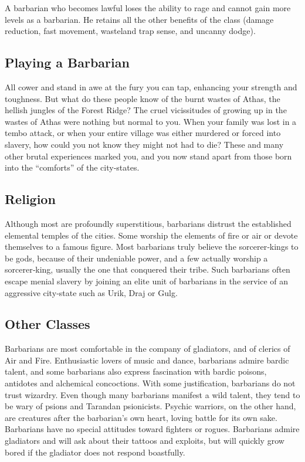 A barbarian who becomes lawful loses the ability to rage and cannot gain more levels as a barbarian. He retains all the other benefits of the class (damage reduction, fast movement, wasteland trap sense, and uncanny dodge).

\subsection{Playing a Barbarian}

All cower and stand in awe at the fury you can tap, enhancing your strength and toughness. But what do these people know of the burnt wastes of Athas, the hellish jungles of the Forest Ridge? The cruel vicissitudes of growing up in the wastes of Athas were nothing but normal to you. When your family was lost in a tembo attack, or when your entire village was either murdered or forced into slavery, how could you not know they might not had to die? These and many other brutal experiences marked you, and you now stand apart from those born into the “comforts” of the city‐states.

\subsection{Religion}

Although most are profoundly superstitious, barbarians distrust the established elemental temples of the cities. Some worship the elements of fire or air or devote themselves to a famous figure. Most barbarians truly believe the sorcerer‐kings to be gods, because of their undeniable power, and a few actually worship a sorcerer‐king, usually the one that conquered their tribe. Such barbarians often escape menial slavery by joining an elite unit of barbarians in the service of an aggressive city‐state such as Urik, Draj or Gulg.

\subsection{Other Classes}

Barbarians are most comfortable in the company of gladiators, and of clerics of Air and Fire. Enthusiastic lovers of music and dance, barbarians admire bardic talent, and some barbarians also express fascination with bardic poisons, antidotes and alchemical concoctions. With some justification, barbarians do not trust wizardry. Even though many barbarians manifest a wild talent, they tend to be wary of psions and Tarandan psionicists. Psychic warriors, on the other hand, are creatures after the barbarian's own heart, loving battle for its own sake. Barbarians have no special attitudes toward fighters or rogues. Barbarians admire gladiators and will ask about their tattoos and exploits, but will quickly grow bored if the gladiator does not respond boastfully.

